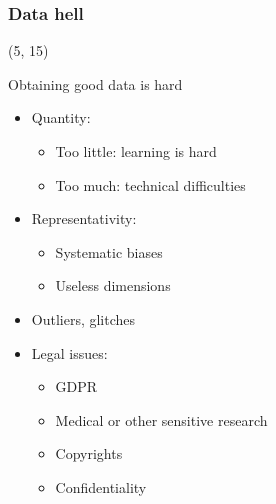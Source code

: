 \begin{frame}
  \frametitle{Data hell}

  \begin{textblock}{90}(5, 15)
    \begin{block}{Obtaining good data is hard}
      \begin{itemize}
      \item<2-> Quantity:
        \begin{itemize}
        \item Too little: learning is hard
        \item Too much: technical difficulties
        \end{itemize}
      \item<3-> Representativity:
        \begin{itemize}
        \item Systematic biases
        \item Useless dimensions
        \end{itemize}
      \item<4-> Outliers, glitches
      \item<5-> Legal issues:
        \begin{itemize}
        \item GDPR
        \item Medical or other sensitive research
        \item Copyrights
        \item Confidentiality
        \end{itemize}
      \end{itemize}
    \end{block}
  \end{textblock}
\end{frame}


